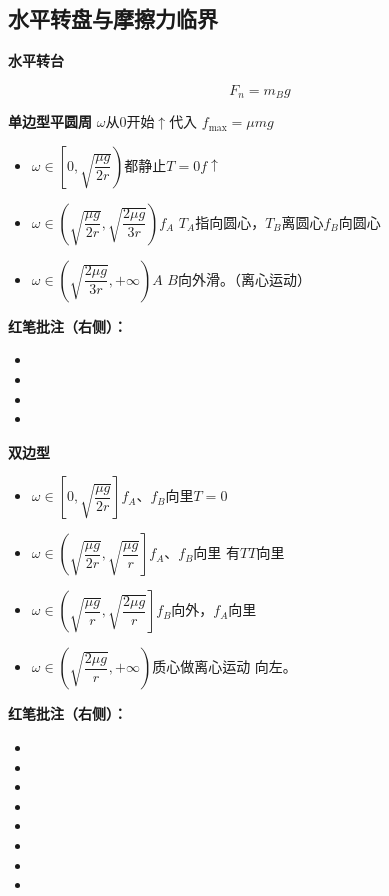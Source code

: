 \subsection{水平转盘与摩擦力临界}
\textbf{水平转台}


\[ F_n=m_Bg \]

\textbf{单边型平圆周}
$\omega$从0开始$\uparrow$\quad 代入 $f_{\max}=\mu mg$
\begin{itemize}
\item $\omega\in\left[0,\sqrt{\dfrac{\mu g}{2r}}\right)$\quad 都静止\quad $T=0$\quad $f\uparrow$
\item $\omega\in\left(\sqrt{\dfrac{\mu g}{2r}},\sqrt{\dfrac{2\mu g}{3r}}\right)$\quad $f_A$ $T_A$指向圆心，$T_B$离圆心\quad $f_B$向圆心
\item $\omega\in\left(\sqrt{\dfrac{2\mu g}{3r}},+\infty\right)$\quad $A$ $B$向外滑。（离心运动）
\end{itemize}
\textbf{红笔批注（右侧）：}
\begin{itemize}
\item {}
\item {} %
\item {}
\item {}
\end{itemize}

\textbf{双边型}
\begin{itemize}
\item $\omega\in\left[0,\sqrt{\dfrac{\mu g}{2r}}\right]$\quad $f_A$、$f_B$向里\quad $T=0$
\item $\omega\in\left(\sqrt{\dfrac{\mu g}{2r}},\sqrt{\dfrac{\mu g}{r}}\right]$\quad $f_A$、$f_B$向里 有$T$\quad $T$向里
\item $\omega\in\left(\sqrt{\dfrac{\mu g}{r}},\sqrt{\dfrac{2\mu g}{r}}\right]$\quad $f_B$向外，$f_A$向里
\item $\omega\in\left(\sqrt{\dfrac{2\mu g}{r}},+\infty\right)$\quad 质心做离心运动 向左。
\end{itemize}
\textbf{红笔批注（右侧）：}
\begin{itemize}
\item {}
\item {}
\item {}
\item {}
\item {}
\item {}
\item {}
\item {}
\end{itemize}

